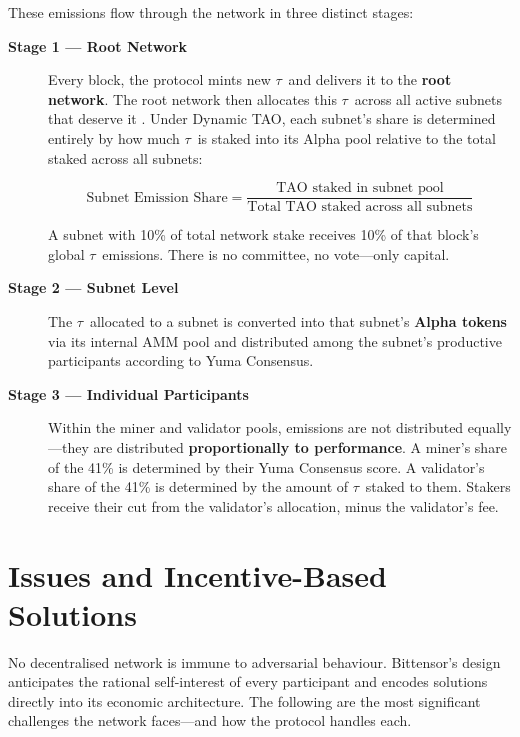 \documentclass[12pt, a4paper, oneside]{report}
\newcommand{\TAO}{$\tau$}            %
\theoremstyle{definition}
\begin{document}
\noindent These emissions flow through the network in three distinct stages:

\begin{description}
  \item[\textbf{Stage 1 — Root Network}] Every block, the protocol mints 
  new \TAO\ and delivers it to the \textbf{root network}. The root network 
  then allocates this \TAO\ across all active subnets that deserve it . Under Dynamic TAO, 
  each subnet's share is determined entirely by how much \TAO\ is staked 
  into its Alpha pool relative to the total staked across all subnets:

  \[
    \text{Subnet Emission Share} = \frac{\text{TAO staked in subnet pool}}
    {\text{Total TAO staked across all subnets}}
  \]

  A subnet with 10\% of total network stake receives 10\% of that block's 
  global \TAO\ emissions. There is no committee, no vote—only capital.

  \item[\textbf{Stage 2 — Subnet Level}] The \TAO\ allocated to a subnet 
  is converted into that subnet's \textbf{Alpha tokens} via its internal 
  AMM pool and distributed among the subnet's productive participants 
  according to Yuma Consensus.



  \item[\textbf{Stage 3 — Individual Participants}] Within the miner and 
  validator pools, emissions are not distributed equally—they are distributed 
  \textbf{proportionally to performance}. A miner's share of the 41\% is 
  determined by their Yuma Consensus score. A validator's share of the 41\% 
  is determined by the amount of \TAO\ staked to them. Stakers receive their 
  cut from the validator's allocation, minus the validator's fee.
\end{description}










\section{Issues and Incentive-Based Solutions}
\label{sec:issues}

No decentralised network is immune to adversarial behaviour. Bittensor's design 
anticipates the rational self-interest of every participant and encodes solutions 
directly into its economic architecture. The following are the most significant 
challenges the network faces—and how the protocol handles each.
\end{document}
